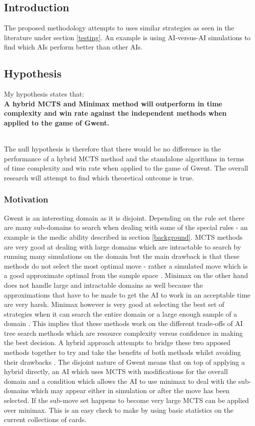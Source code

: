 \documentclass [11pt]{article}
\begin{document}
	\subsection{Introduction}
	The proposed methodology attempts to uses similar strategies as seen in the literature under section \ref{testing}. An example is using AI-versus-AI simulations to find which AIs perform better than other AIs.
	
	\subsection{Hypothesis}
	My hypothesis states that:\\
	\indent\textbf{A hybrid MCTS and Minimax method will outperform in time complexity and win rate against the independent methods when applied to the game of Gwent.}\\\
	
	\noindent The null hypothesis is therefore that there would be no difference in the performance of a hybrid MCTS method and the standalone algorithms in terms of time complexity and win rate when applied to the game of Gwent. The overall research will attempt to find which theoretical outcome is true.
	
	\subsubsection{Motivation}
	Gwent is an interesting domain as it is disjoint. Depending on the rule set there are many sub-domains to search when dealing with some of the special rules - an example is the medic ability described in section \ref{background}. MCTS methods are very good at dealing with large domains which are intractable to search by running many simulations on the domain but the main drawback is that these methods do not select the most optimal move - rather a simulated move which is a good approximate optimal from the sample space \cite{survey}. Minimax on the other hand does not handle large and intractable domains as well because the approximations that have to be made to get the AI to work in an acceptable time are very harsh. Minimax however is very good at selecting the best set of strategies when it can search the entire domain or a large enough sample of a domain \cite{AIModern}. This implies that these methods work on the different trade-offs of AI tree search methods which are resource complexity versus confidence in making the best decision. A hybrid approach attempts to bridge these two apposed methods together to try and take the benefits of both methods whilst avoiding their drawbacks \cite{hybrids}. The disjoint nature of Gwent means that on top of applying a hybrid directly, an AI which uses MCTS with modifications for the overall domain and a condition which allows the AI to use minimax to deal with the sub-domains which may appear either in simulation or after the move has been selected. If the sub-move set happens to become very large MCTS can be applied over minimax. This is an easy check to make by using basic statistics on the current collections of cards. 
	
\end{document}
